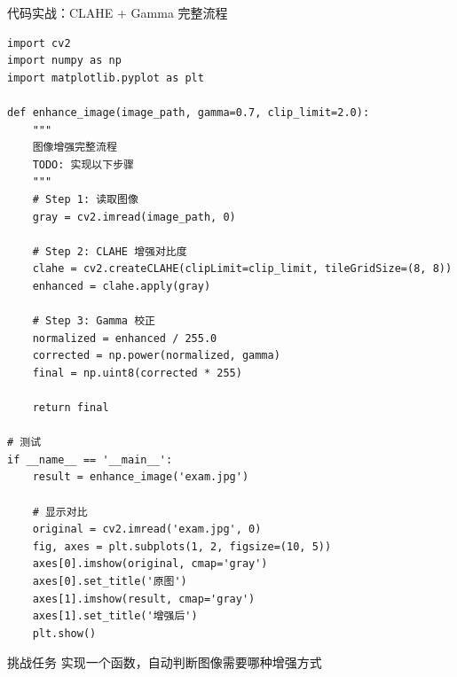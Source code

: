 \begin{frame}[fragile]{代码实战：CLAHE + Gamma 完整流程}
    \begin{lstlisting}[basicstyle=\ttfamily\scriptsize]
import cv2
import numpy as np
import matplotlib.pyplot as plt

def enhance_image(image_path, gamma=0.7, clip_limit=2.0):
    """
    图像增强完整流程
    TODO: 实现以下步骤
    """
    # Step 1: 读取图像
    gray = cv2.imread(image_path, 0)

    # Step 2: CLAHE 增强对比度
    clahe = cv2.createCLAHE(clipLimit=clip_limit, tileGridSize=(8, 8))
    enhanced = clahe.apply(gray)

    # Step 3: Gamma 校正
    normalized = enhanced / 255.0
    corrected = np.power(normalized, gamma)
    final = np.uint8(corrected * 255)

    return final

# 测试
if __name__ == '__main__':
    result = enhance_image('exam.jpg')

    # 显示对比
    original = cv2.imread('exam.jpg', 0)
    fig, axes = plt.subplots(1, 2, figsize=(10, 5))
    axes[0].imshow(original, cmap='gray')
    axes[0].set_title('原图')
    axes[1].imshow(result, cmap='gray')
    axes[1].set_title('增强后')
    plt.show()
    \end{lstlisting}

    \begin{alertblock}{挑战任务}
        实现一个函数，自动判断图像需要哪种增强方式
    \end{alertblock}
\end{frame}
